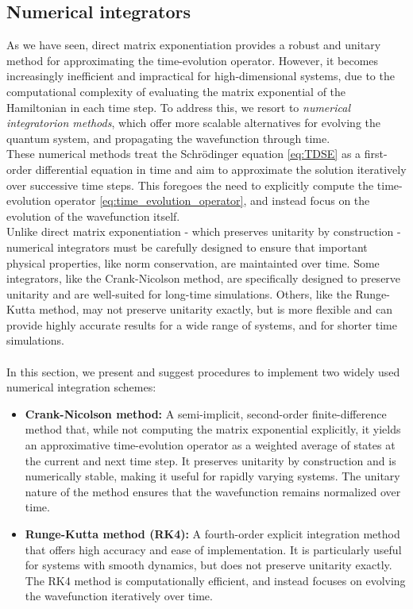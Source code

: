 \documentclass{subfiles}
\begin{document}
\subsection{Numerical integrators}
As we have seen, direct matrix exponentiation provides a robust and unitary method for approximating the time-evolution operator. However, it becomes increasingly inefficient and impractical for high-dimensional systems, due to the computational complexity of evaluating the matrix exponential of the Hamiltonian in each time step. To address this, we resort to \emph{numerical integratorion methods}, which offer more scalable alternatives for evolving the quantum system, and propagating the wavefunction through time.  \\

These numerical methods treat the Schrödinger equation \eqref{eq:TDSE} as a first-order differential equation in time and aim to approximate the solution iteratively over successive time steps. This foregoes the need to explicitly compute the time-evolution operator \eqref{eq:time_evolution_operator}, and instead focus on the evolution of the wavefunction itself. \\


Unlike direct matrix exponentiation - which preserves unitarity by construction - numerical integrators must be carefully designed to ensure that important physical properties, like norm conservation, are maintainted over time. Some integrators, like the Crank-Nicolson method, are specifically designed to preserve unitarity and are well-suited for long-time simulations. Others, like the Runge-Kutta method, may not preserve unitarity exactly, but is more flexible and can provide highly accurate results for a wide range of systems, and for shorter time simulations. \\ \\ In this section, we present and suggest procedures to implement two widely used numerical integration schemes:
\begin{itemize}
    \item \textbf{Crank-Nicolson method:} A semi-implicit, second-order finite-difference method that, while not computing the matrix exponential explicitly, it yields an approximative time-evolution operator as a weighted average of states at the current and next time step. It preserves unitarity by construction and is numerically stable, making it useful for rapidly varying systems. The unitary nature of the method ensures that the wavefunction remains normalized over time.
    \item \textbf{Runge-Kutta method (RK4):} A fourth-order explicit integration method that offers high accuracy and ease of implementation. It is particularly useful for systems with smooth dynamics, but does not preserve unitarity exactly. The RK4 method is computationally efficient, and instead focuses on evolving the wavefunction iteratively over time.
\end{itemize}
\end{document}
